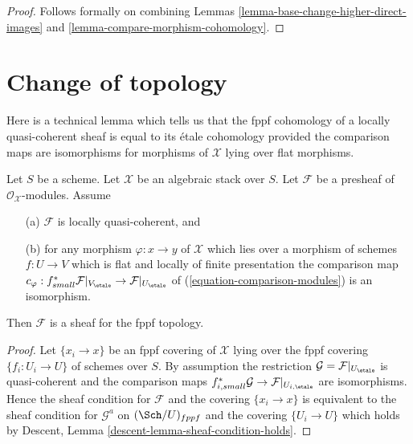 \begin{proof}
Follows formally on combining
Lemmas \ref{lemma-base-change-higher-direct-images} and
\ref{lemma-compare-morphism-cohomology}.
\end{proof}











\section{Change of topology}
\label{section-change-topology}

\noindent
Here is a technical lemma which tells us that the
fppf cohomology of a locally quasi-coherent sheaf is equal to its
\'etale cohomology provided the comparison maps are isomorphisms
for morphisms of $\mathcal{X}$ lying over flat morphisms.

\begin{lemma}
\label{lemma-lqc-flat-base-change-fppf-sheaf}
Let $S$ be a scheme. Let $\mathcal{X}$ be an algebraic stack over $S$.
Let $\mathcal{F}$ be a presheaf of $\mathcal{O}_\mathcal{X}$-modules.
Assume
\begin{enumerate}
\item[(a)] $\mathcal{F}$ is locally quasi-coherent, and
\item[(b)] for any morphism $\varphi : x \to y$ of $\mathcal{X}$ which lies
over a morphism of schemes $f : U \to V$ which is flat and
locally of finite presentation the comparison map
$c_\varphi : f_{small}^*\mathcal{F}|_{V_\etale} \to
\mathcal{F}|_{U_\etale}$ of
(\ref{equation-comparison-modules}) is an isomorphism.
\end{enumerate}
Then $\mathcal{F}$ is a sheaf for the fppf topology.
\end{lemma}

\begin{proof}
Let $\{x_i \to x\}$ be an fppf covering of $\mathcal{X}$ lying over the
fppf covering $\{f_i : U_i \to U\}$ of schemes over $S$.
By assumption the restriction $\mathcal{G} = \mathcal{F}|_{U_\etale}$
is quasi-coherent and the comparison maps
$f_{i, small}^*\mathcal{G} \to \mathcal{F}|_{U_{i, \etale}}$
are isomorphisms. Hence the sheaf condition for $\mathcal{F}$
and the covering $\{x_i \to x\}$ is equivalent to the sheaf condition
for $\mathcal{G}^a$ on $(\Sch/U)_{fppf}$ and the covering $\{U_i \to U\}$
which holds by
Descent, Lemma \ref{descent-lemma-sheaf-condition-holds}.
\end{proof}

